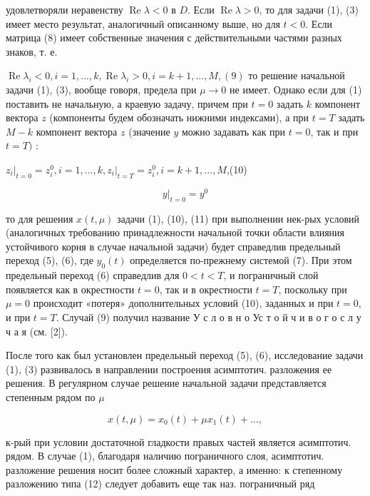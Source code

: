 \documentclass[10pt]{article}
\begin{document}
удовлетворяли неравенству $\operatorname{Re} \lambda<0$ в $D$. Если $\operatorname{Re} \lambda>0$, то для задачи (1), (3) имеет место результат, аналогичный описанному выше, но для $t<0$. Если матрица (8) имеет собственные значения с действительными частями разных знаков, т. е.



$\operatorname{Re} \lambda_{i}<0, i=1, \ldots, k, \operatorname{Re} \lambda_{i}>0, i=k+1, \ldots, M,(9)$ то решение начальной задачи (1), (3), вообще говоря, предела при $\mu \rightarrow 0$ не имеет. Однако если для (1) поставить не начальную, а краевую задачу, причем при $t=0$ задать $k$ компонент вектора $z$ (компоненты будем обозначать нижними индексами), а при $t=T$ задать $M-k$ компонент вектора $z$ (значение $y$ можно задавать как при $t=0$, так и при $t=T)$ :



$\left.z_{i}\right|_{t=0}=z_{i}^{0}, i=1, \ldots, k,\left.z_{i}\right|_{t=T}=z_{i}^{0}, i=k+1, \ldots, M$,(10)



\[

\left.y\right|_{t=0}=y^{0}

\]



то для решения $x(t, \mu)$ задачи (1), (10), (11) при выполнении нек-рых условий (аналогичных требованию принадлежности начальной точки области влияния устойчивого корня в случае начальной задачи) будет справедлив предельный переход (5), (6), где $y_{0}(t)$ определяется по-прежнему системой (7). При этом предельный переход (6) справедлив для $0<t<T$, и пограничный слой появляется как в окрестности $t=0$, так и в окрестности $t=T$, поскольку при $\mu=0$ происходит «потеря» дополнительных условий (10), заданных и при $t=0$, и при $t=T$. Случай (9) получил название У с л о в н о Ус т о й ч и в о г о с л у ч а я (см. [2]).



После того как был установлен предельный переход (5), (6), исследование задачи (1), (3) развивалось в направлении построения асимптотич. разложения ее решения. В регулярном случае решение начальной задачи представляется степенным рядом по $\mu$



\[

x(t, \mu)=x_{0}(t)+\mu x_{1}(t)+\ldots,

\]



к-рый при условии достаточной гладкости правых частей является асимптотич. рядом. В случае (1), благодаря наличию пограничного слоя, асимптотич. разложение решения носит более сложный характер, а именно: к степенному разложению типа (12) следует добавить еще так наз. пограничный ряд
\end{document}
